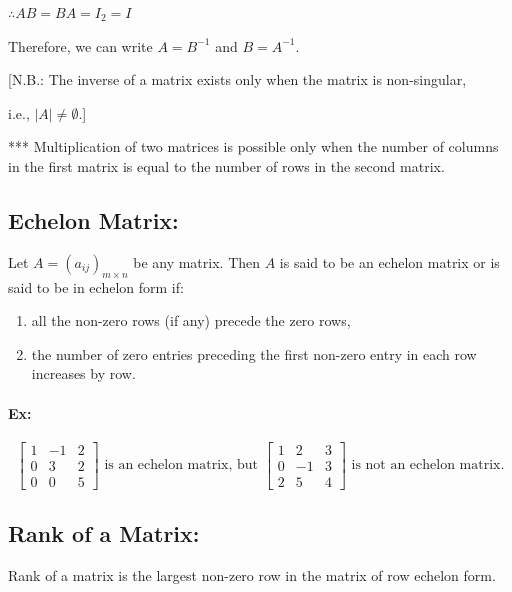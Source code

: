 \documentclass{article}
\begin{document}
    \vspace{10pt}
    
    \(\therefore\)\(AB = BA = I_{2} = I\)
    
    Therefore, we can write \( A = B^{-1} \) and \( B = A^{-1} \).

    \vspace{30pt}
    [N.B.: The inverse of a matrix exists only when the matrix is non-singular,

i.e., \( |A| \neq \emptyset \).]

    *** Multiplication of two matrices is possible only when the number of columns in the first matrix is equal to the number of rows in the second matrix.

\vspace{20pt}

\subsection{Echelon Matrix:}
    \vspace{10pt}
    Let \( A = (a_{ij})_{m \times n} \) be any matrix. Then \( A \) is said to be an echelon matrix or is said to be in echelon form if:
    \begin{enumerate}
        \item all the non-zero rows (if any) precede the zero rows,
        \item the number of zero entries preceding the first non-zero entry in each row increases by row.
    \end{enumerate}

    \vspace{10pt}

    \paragraph{Ex:}
    \[\begin{bmatrix} 1 & -1 & 2 \\ 0 & 3 & 2 \\ 0 & 0 & 5 \end{bmatrix} \text{ is an echelon matrix,  but } \begin{bmatrix} 1 & 2 & 3 \\ 0 & -1 & 3 \\ 2 & 5 & 4 \end{bmatrix} \text{ is not an echelon matrix.}\]

    \vspace{20px}

\subsection{Rank of a Matrix:}
    \vspace{10pt}
    Rank of a matrix is the largest non-zero row in the matrix of row echelon form.
\end{document}
